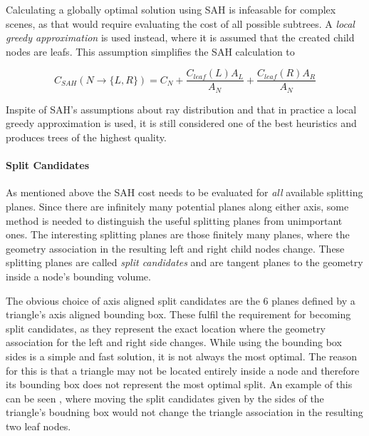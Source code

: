 Calculating a globally optimal solution using SAH is infeasable for
complex scenes, as that would require evaluating the cost of all
possible subtrees. A \textit{local greedy approximation} is used
instead, where it is assumed that the created child nodes are
leafs. This assumption simplifies the SAH calculation to

\begin{displaymath}
  C_{SAH}(N \rightarrow \{L, R\}) = C_N + \frac{C_{leaf}(L) A_L}{A_N}
  + \frac{C_{leaf}(R) A_R}{A_N}
\end{displaymath}


Inspite of SAH's assumptions about ray distribution and that in
practice a local greedy approximation is used, it is still considered
one of the best heuristics and produces trees of the highest quality.



\paragraph{Split Candidates}


As mentioned above the SAH cost needs to be evaluated for \textit{all}
available splitting planes. Since there are infinitely many potential
planes along either axis, some method is needed to distinguish the
useful splitting planes from unimportant ones. The interesting
splitting planes are those finitely many planes, where the geometry
association in the resulting left and right child nodes change. These
splitting planes are called \textit{split candidates} and are tangent
planes to the geometry inside a node's bounding volume.


The obvious choice of axis aligned split candidates are the 6 planes
defined by a triangle's axis aligned bounding box. These fulfil the
requirement for becoming split candidates, as they represent the exact
location where the geometry association for the left and right side
changes. While using the bounding box sides is a simple and fast
solution, it is not always the most optimal. The reason for this is
that a triangle may not be located entirely inside a node and
therefore its bounding box does not represent the most optimal
split. An example of this can be seen , where
moving the split candidates given by the sides of the triangle's
boudning box would not change the triangle association in the
resulting two leaf nodes.

